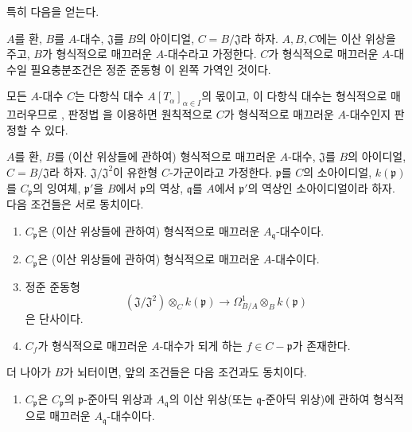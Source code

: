특히 다음을 얻는다.

\begin{corollary}[22.6.3]
\label{0.22.6.3-ko}
$A$를 환, $B$를 $A$-대수, $\mathfrak J$를 $B$의 아이디얼,
$C=B/\mathfrak J$라 하자. $A,B,C$에는 이산 위상을 주고, $B$가
형식적으로 매끄러운 $A$-대수라고 가정한다. $C$가 형식적으로 매끄러운
$A$-대수일 필요충분조건은 정준 준동형 이 왼쪽
가역인 것이다.
\end{corollary}

모든 $A$-대수 $C$는 다항식 대수 $A[T_\alpha]_{\alpha\in I}$의
몫이고, 이 다항식 대수는 형식적으로 매끄러우므로
, 판정법 을 이용하면 원칙적으로
$C$가 형식적으로 매끄러운 $A$-대수인지 판정할 수 있다.

\begin{proposition}[22.6.4]
\label{0.22.6.4-ko}
$A$를 환, $B$를 (이산 위상들에 관하여) 형식적으로 매끄러운
$A$-대수, $\mathfrak J$를 $B$의 아이디얼, $C=B/\mathfrak J$라 하자.
$\mathfrak J/\mathfrak J^2$이 유한형 $C$-가군이라고 가정한다.
$\mathfrak p$를 $C$의 소아이디얼, $k(\mathfrak p)$를
$C_{\mathfrak p}$의 잉여체, $\mathfrak p'$을 $B$에서
$\mathfrak p$의 역상, $\mathfrak q$를 $A$에서 $\mathfrak p'$의
역상인 소아이디얼이라 하자. 다음 조건들은 서로 동치이다.
\begin{enumerate}
  \item[a)] $C_{\mathfrak p}$은 (이산 위상들에 관하여) 형식적으로
  매끄러운 $A_{\mathfrak q}$-대수이다.
  \item[a')] $C_{\mathfrak p}$은 (이산 위상들에 관하여) 형식적으로
  매끄러운 $A$-대수이다.
  \item[b)] 정준 준동형
  \begin{equation}
  \label{0.22.6.4.1-ko}
    (\mathfrak J/\mathfrak J^2)\otimes_Ck(\mathfrak p)
    \longrightarrow\Omega^1_{B/A}\otimes_Bk(\mathfrak p)
    \tag{22.6.4.1}
  \end{equation}
  은 단사이다.
  \item[c)] $C_f$가 형식적으로 매끄러운 $A$-대수가 되게 하는
  $f\in C-\mathfrak p$가 존재한다.
\end{enumerate}
더 나아가 $B$가 뇌터이면, 앞의 조건들은 다음 조건과도 동치이다.
\begin{enumerate}
  \item[d)] $C_{\mathfrak p}$은 $C_{\mathfrak p}$의
  $\mathfrak p$-준아딕 위상과 $A_{\mathfrak q}$의 이산 위상(또는
  $\mathfrak q$-준아딕 위상)에 관하여 형식적으로 매끄러운
  $A_{\mathfrak q}$-대수이다.
\end{enumerate}
\end{proposition}

